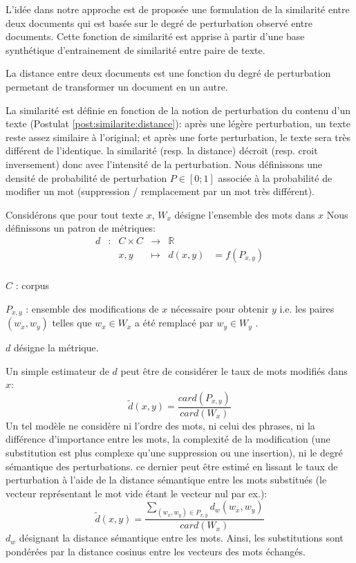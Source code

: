 L'idée dans notre approche est de proposée une formulation de la similarité entre deux documents qui est basée sur le degré de perturbation observé entre documents. Cette fonction de similarité est apprise à partir d'une base synthétique d'entrainement de similarité entre paire de texte. 
\begin{postulat}
La distance entre deux documents est une fonction du degré de perturbation permetant de transformer un document en un autre. \label{post:similarite:distance}
\end{postulat}
La similarité est définie en fonction de la notion de perturbation du contenu d'un texte (Postulat \ref{post:similarite:distance}): après une légère perturbation, un texte reste assez similaire à l'original; et après une forte perturbation, le texte sera très différent de l'identique. la similarité (resp. la distance) décroit (resp. croit inversement) donc avec l'intensité de la perturbation. Nous définissons une densité de probabilité de perturbation $P \in [0; 1]$ associée à la probabilité de modifier un mot (suppression / remplacement par un mot très différent). 

Considérons que pour tout texte $x$, $W_x$ désigne l'ensemble des mots dans $x$
Nous définissons un patron de métriques:
\begin{equation}
\begin{array}{cccccc}
d & : & C \times C & \to & \mathbb{R} & \\
 & & x, y & \mapsto & d(x, y) & = f(P_{x,y}) \\
\end{array}
\end{equation}

$C$ : corpus

$P_{x,y}$ : ensemble des modifications de $x$ nécessaire pour obtenir $y$ i.e. les paires $(w_x, w_y)$ telles que $w_x \in W_x$ a été remplacé par $w_y \in W_y$  .

$d$ désigne la métrique.

Un simple estimateur de $d$ peut être de considérer le taux de mots modifiés dans $x$: 
\begin{equation}
\widetilde{d}(x,y) = \frac{card(P_{x,y})}{card(W_x)}
\end{equation}
 Un tel modèle ne considère ni l'ordre des mots, ni celui des phrases, ni la différence d'importance entre les mots, la complexité de la modification (une substitution est plus complexe qu'une suppression ou une insertion), ni le degré sémantique des perturbations. ce dernier peut être estimé en lissant le taux de perturbation à l'aide de la distance sémantique entre les mots substitués (le vecteur représentant le mot vide étant le vecteur nul par ex.):
\begin{equation}
\widetilde{d}(x,y) = \frac{\sum\limits_{(w_x, w_y) \in P_{x,y}} d_w(w_x,w_y)}{card(W_x)} \label{equation:similarite:somme-dist-mots}
\end{equation}
$d_w$ désignant la distance sémantique entre les mots. Ainsi, les substitutions sont pondérées par la distance cosinus entre les vecteurs des mots échangés.

